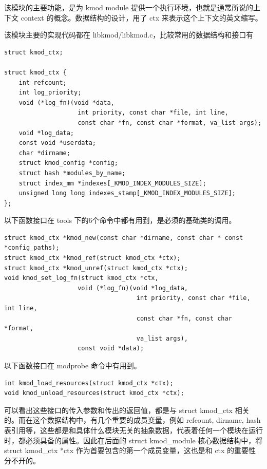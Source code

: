 \documentclass[11pt,a4paper]{article}
\begin{document}
该模块的主要功能，是为 kmod module
提供一个执行环境，也就是通常所说的上下文 context
的概念。数据结构的设计，用了 ctx 来表示这个上下文的英文缩写。

该模块主要的实现代码都在 libkmod/libkmod.c，比较常用的数据结构和接口有

{\begin{shaded}\begin{verbatim}
struct kmod_ctx;

struct kmod_ctx {
    int refcount;
    int log_priority;
    void (*log_fn)(void *data,
                    int priority, const char *file, int line,
                    const char *fn, const char *format, va_list args);
    void *log_data;
    const void *userdata;
    char *dirname;
    struct kmod_config *config;
    struct hash *modules_by_name;
    struct index_mm *indexes[_KMOD_INDEX_MODULES_SIZE];
    unsigned long long indexes_stamp[_KMOD_INDEX_MODULES_SIZE];
};
\end{verbatim}\end{shaded}}
以下函数接口在 tools 下的6个命令中都有用到，是必须的基础类的调用。

{\begin{shaded}\begin{verbatim}
struct kmod_ctx *kmod_new(const char *dirname, const char * const *config_paths);
struct kmod_ctx *kmod_ref(struct kmod_ctx *ctx);
struct kmod_ctx *kmod_unref(struct kmod_ctx *ctx);
void kmod_set_log_fn(struct kmod_ctx *ctx,
                    void (*log_fn)(void *log_data,
                                    int priority, const char *file, int line,
                                    const char *fn, const char *format,
                                    va_list args),
                    const void *data);
\end{verbatim}\end{shaded}}
以下函数接口在 modprobe 命令中有用到。

{\begin{shaded}\begin{verbatim}
int kmod_load_resources(struct kmod_ctx *ctx);
void kmod_unload_resources(struct kmod_ctx *ctx);
\end{verbatim}\end{shaded}}
可以看出这些接口的传入参数和传出的返回值，都是与 struct kmod\_ctx
相关的。而在这个数据结构中，有几个重要的成员变量，例如 refcount, dirname,
hash表引用等，这些都是和具体什么模块无关的抽象数据，代表着任何一个模块在运行时，都必须具备的属性。因此在后面的
struct kmod\_module 核心数据结构中，将 struct kmod\_ctx *ctx
作为首要包含的第一个成员变量，这也是和 ctx 的重要性分不开的。
\end{document}
